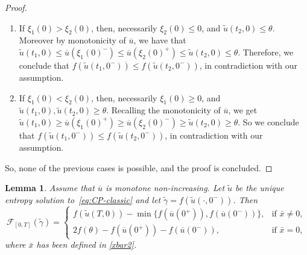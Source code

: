 \documentclass[a4paper, 10pt, final]{article}
\newtheorem{lemma}{Lemma}[section]
\begin{document}
\begin{proof}
\begin{enumerate}
  If $\xi_1(0)>0$, we have that $\widetilde u(t_1,0),\widetilde u(t_2,0)\geq \theta$, and we argue exactly as before, by symmetry and obtain  $f(\widetilde u(t_1,0))< f(\widetilde u(t_2,0))$, in contradiction with our assumption.

  So, this case is not possible. 
  
 \item  If $\xi_1(0)>\xi_2(0)$, then, necessarily $\xi_2(0)\leq 0$,  and $\widetilde  u(t_2,0)\leq \theta$.  
 Moreover by monotonicity of $\overline u$, we have that  
  $\widetilde u(t_1,0) \leq \overline u(\xi_1(0)^-) \leq \overline u(\xi_2(0)^+)\leq \widetilde u(t_2,0)\leq \theta$. Therefore,    
  we conclude that $f(\widetilde u(t_1,0^-))\leq f(\widetilde u(t_2,0^-))$, in contradiction with our assumption.

 

  \item  If $\xi_1(0)<\xi_2(0)$, then, necessarily $\xi_1(0)\geq 0$,  and $\widetilde  u(t_1,0),\widetilde  u(t_2,0)\geq \theta$. 
   Recalling the monotonicity of $\overline u$, we get 
  $\widetilde u(t_1,0) \geq \overline u(\xi_1(0)^+) \geq \overline u(\xi_2(0)^-)\geq \widetilde u(t_2,0)\geq \theta$.  So   
  we conclude that $f(\widetilde u(t_1,0^-))\leq f(\widetilde u(t_2,0^-))$, in contradiction with our assumption.

      \end{enumerate}
      So, none of the previous cases is possible, and the proof is concluded. 
\end{proof}
\begin{lemma} 
  \label{monentro2}
  Assume that  
  $\overline u $ is monotone non-increasing. 
  Let $\widetilde u$ be the unique entropy solution to~\eqref{eq:CP-classic} and let 
  $\widetilde \gamma = f(\widetilde u(\cdot,0^-))$. 
  Then
  \begin{equation}
    \label{eq:estimate-F}
    \mathcal F_{[0,T]}(\widetilde \gamma)
    = 
    \begin{cases} 
       f(\widetilde u(T,0)) - \min\{f(\overline u(0^+)),f(\overline u(0^-))\}, 
      & \textrm{if } \bar x\neq 0,
      \\
      2 f(\theta) - f(\overline u(0^+)) - f(\overline u(0^-)),&  \textrm{if } \bar x=0,
    \end{cases} 
  \end{equation}
 where $\bar x$ has been defined in \eqref{xbar2}.

\end{lemma} 
\end{document}
